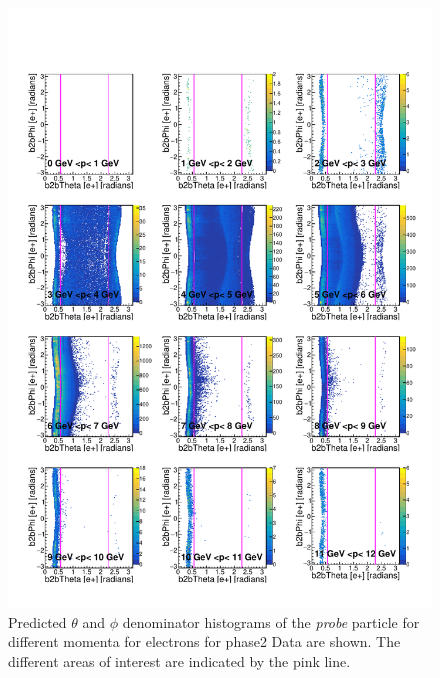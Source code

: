 \documentclass[a4paper,11pt,twosided,final,german,openbib,pdftex,listof=totoc,bibliography=totoc]{scrbook}
\begin{document}
\begin{appendix}
\begin{figure}[h!]
	\includegraphics[width=\textwidth]{Plots/master/RTPMemD_Data.pdf}
	\caption[Denominator $\theta$-$\phi$ Electron Momentum Phase2 Data]{Predicted $\theta$ and $\phi$ denominator histograms of the \textit{probe} particle for different momenta for electrons for phase2 Data are shown. The different areas of interest are indicated by the pink line.}
	\label{plt:RTPMemD_Data}
\end{figure}




\end{appendix}
\end{document}
